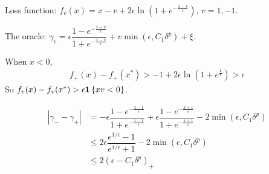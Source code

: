 \documentclass[11pt,letterpaper,english]{article}
\begin{document}
Loss function: $f_v(x) = x-v+2\epsilon \ln\left(1+e^{-\frac{x-v}{\epsilon}}  \right)$, $v= 1, -1$.

The oracle: $\gamma_v = \epsilon \dfrac{1-e^{-\frac{x-v}{\epsilon}}}{1+e^{-\frac{x-v}{\epsilon}}}+v \min \left( \epsilon, C_1 \delta^p \right)+\xi$.

When $x<0$, 
\begin{align*}
f_+(x)-f_+(x^*) > -1 +2\epsilon \ln\left( 1+e^{\frac{1}{\epsilon}} \right) >\epsilon
\end{align*}
So $f_v(x)-f_v(x^*)>\epsilon \mathbf{1}\left\{x v  < 0\right\}$.

\begin{align*}
|\gamma_--\gamma_+| &= -\epsilon \dfrac{1-e^{-\frac{x-1}{\epsilon}}}{1+e^{-\frac{x-1}{\epsilon}}} + \epsilon \dfrac{1-e^{-\frac{x+1}{\epsilon}}}{1+e^{-\frac{x+1}{\epsilon}}}-2 \min \left( \epsilon, C_1 \delta^p \right)\\
&\leq 2\epsilon \dfrac{e^{1/\epsilon}-1}{e^{1/\epsilon}+1}-2 \min \left( \epsilon, C_1 \delta^p \right)\\
&\leq 2\left( \epsilon -C_1\delta^p \right)_+
\end{align*}
\end{document}
